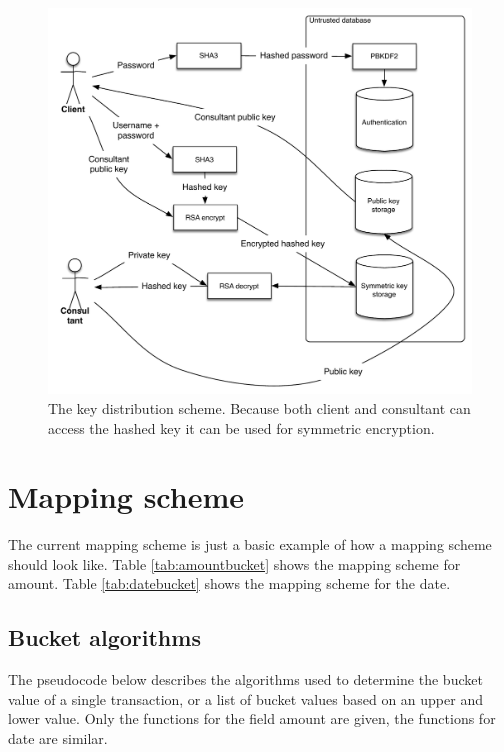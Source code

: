 \documentclass[a4paper]{article}
\begin{document}
\begin{figure}
\centering
\includegraphics[scale=0.5]{keydist.pdf}
\caption{The key distribution scheme. Because both client and consultant can access the hashed key it can be used for symmetric encryption.}
\label{fig:keydist}
\end{figure}

\section{Mapping scheme}
	The current mapping scheme is just a basic example of how a mapping scheme should look like. Table \ref{tab:amountbucket} shows the mapping scheme for amount. Table \ref{tab:datebucket} shows the mapping scheme for the date. 
    
\subsection{Bucket algorithms}
	The pseudocode below describes the algorithms used to determine the bucket value of a single transaction, or a list of bucket values based on an upper and lower value. Only the functions for the field amount are given, the functions for date are similar.
\end{document}
